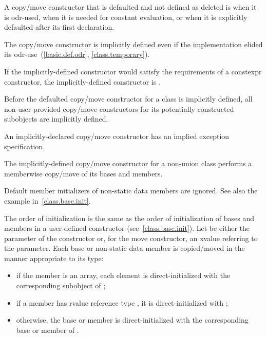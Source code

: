 \pnum
{}%
%
A copy/move constructor
that is defaulted and not defined as deleted
is
when it is odr-used,
when it is needed for constant evaluation, or
when it is explicitly defaulted after its first declaration.
\begin{note}
The copy/move constructor is implicitly defined even if the implementation elided
its odr-use~(\ref{basic.def.odr}, \ref{class.temporary}).
\end{note}
If the implicitly-defined constructor would satisfy the requirements of a
constexpr constructor, the implicitly-defined
constructor is .

\pnum
Before the defaulted copy/move constructor for a class is
implicitly defined,
all non-user-provided copy/move constructors for its
potentially constructed subobjects
are implicitly defined.
\begin{note}
An implicitly-declared copy/move constructor has an
implied exception specification.
\end{note}

\pnum
The implicitly-defined copy/move constructor for a non-union class
performs a memberwise copy/move of its bases and members.
\begin{note}
Default member initializers of non-static data members are ignored. See also the example in~\ref{class.base.init}.
\end{note}
The order of initialization is the same as the order of initialization of bases
and members in a user-defined constructor (see~\ref{class.base.init}).
Let  be either the parameter of the constructor or, for the move constructor, an
xvalue referring to the parameter.
Each base or non-static data member
is copied/moved in the manner appropriate to its type:
\begin{itemize}
\item
if the member is an array, each element is
direct-initialized with the corresponding subobject of ;

\item
if a member  has rvalue reference type , it is direct-initialized with
;

\item
otherwise, the base or member is direct-initialized with the corresponding base or member of .
\end{itemize}

